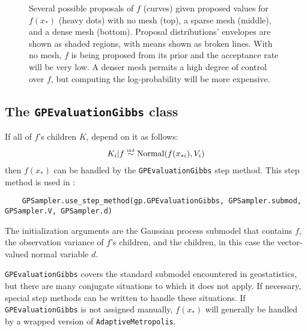 \begin{figure}
    \centering
    \caption{Several possible proposals of $f$ (curves) given proposed values for $f(x_*)$ (heavy dots) with no mesh (top), a sparse mesh (middle), and a dense mesh (bottom). Proposal distributions' envelopes are shown as shaded regions, with means shown as broken lines. With no mesh, $f$ is being proposed from its prior and the acceptance rate will be very low. A denser mesh permits a high degree of control over $f$, but computing the log-probability will be more expensive.}
    \label{fig:meshpropose}
\end{figure}

\subsection{The \texttt{GPEvaluationGibbs} class} 
If all of $f$'s children $K$, depend on it as follows:
\begin{eqnarray*}
    K_i|f \stackrel{\textup{\tiny ind}}{\sim} \textup{Normal}(f(x_{*i}),V_i)
\end{eqnarray*}
then $f(x_*)$ can be handled by the \texttt{GPEvaluationGibbs} step method. This step method is used in :
\begin{verbatim}
    GPSampler.use_step_method(gp.GPEvaluationGibbs, GPSampler.submod, GPSampler.V, GPSampler.d)
\end{verbatim}
The initialization arguments are the Gaussian process submodel that contains $f$, the observation variance of $f$'s children, and the children, in this case the vector-valued normal variable $d$. 

\texttt{GPEvaluationGibbs} covers the standard submodel encountered in geostatistics, but there are many conjugate situations to which it does not apply. If necessary, special step methods can be written to handle these situations. If \texttt{GPEvaluationGibbs} is not assigned manually, $f(x_*)$ will generally be handled by a wrapped version of \texttt{AdaptiveMetropolis}.





